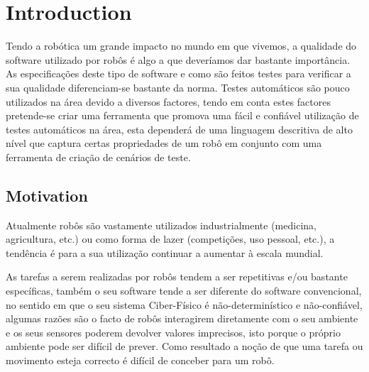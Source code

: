 \chapter{Introduction}
\label{chap:introduction}

Tendo a robótica um grande impacto no mundo em que vivemos, a qualidade do software utilizado por 
robôs é algo a que deveríamos dar bastante importância. As especificações deste tipo de software e 
como são feitos testes para verificar a sua qualidade diferenciam-se bastante da norma. Testes 
automáticos são pouco utilizados na área devido a diversos factores, tendo em conta estes factores 
pretende-se criar uma ferramenta que promova uma fácil e confiável utilização de testes automáticos 
na área, esta dependerá de uma linguagem descritiva de alto nível que captura certas propriedades de 
um robô em conjunto com uma ferramenta de criação de cenários de teste.

\section{Motivation}
\label{sec:motivation}
Atualmente robôs são vastamente utilizados industrialmente (medicina, agricultura, etc.) ou como 
forma de lazer (competições, uso pessoal, etc.), a tendência é para a sua utilização continuar a 
aumentar à escala mundial. 


As tarefas a serem realizadas por robôs tendem a ser repetitivas e/ou 
bastante específicas, também o seu software tende a ser diferente do software convencional, no 
sentido em que o seu sistema Ciber-Físico é não-determinístico e não-confiável, algumas razões são o 
facto de robôs interagirem diretamente com o seu ambiente e os seus sensores poderem devolver valores 
imprecisos, isto porque o próprio ambiente pode ser difícil de prever. Como resultado a noção de que 
uma tarefa ou movimento esteja correcto é difícil de conceber para um robô. 



